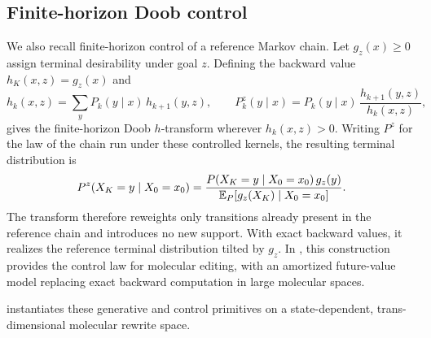 \subsection{Finite-horizon Doob control}
\label{sec:prelim-ctrl}

We also recall finite-horizon control of a reference Markov chain. Let $g_z(x)\ge 0$ assign terminal desirability under goal $z$. Defining the backward value $h_K(x,z)=g_z(x)$ and
\begin{equation}
h_k(x,z)=\sum_{y} P_k(y\mid x)\,h_{k+1}(y,z),
\qquad
P^z_k(y\mid x)=P_k(y\mid x)\,\frac{h_{k+1}(y,z)}{h_k(x,z)},
\label{eq:doobprelim}
\end{equation}
gives the finite-horizon Doob $h$-transform wherever $h_k(x,z)>0$. Writing $P^z$ for the law of the chain run under these controlled kernels, the resulting terminal distribution is
\begin{equation}
P^{z}(X_K=y\mid X_0=x_0)
=\frac{P(X_K=y\mid X_0=x_0)\,g_z(y)}{\mathbb{E}_P\!\left[g_z(X_K)\mid X_0=x_0\right]}.
\label{eq:terminaltilt}
\end{equation}
The transform therefore reweights only transitions already present in the reference chain and introduces no new support. With exact backward values, it realizes the reference terminal distribution tilted by $g_z$. In \method{}, this construction provides the control law for molecular editing, with an amortized future-value model replacing exact backward computation in large molecular spaces.

\method{} instantiates these generative and control primitives on a state-dependent, trans-dimensional molecular rewrite space.
